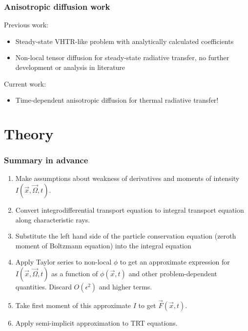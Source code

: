 \documentclass{beamer}
\begin{document}
\begin{frame}
  \frametitle{Anisotropic diffusion work}
  Previous work:
  \begin{itemize}
    \item Steady-state VHTR-like problem with analytically calculated
      coefficients \cite{Lar2009c}
    \item Non-local tensor diffusion \cite{Mor2007} for steady-state
      radiative transfer, no further development or
      analysis in literature
  \end{itemize}
  Current work:
  \begin{itemize}
    \item Time-dependent anisotropic diffusion for thermal radiative transfer!
  \end{itemize}
\end{frame}
\section{Theory}
\begin{frame}
  \frametitle{Summary in advance}
  \begin{enumerate}
    \item Make assumptions about weakness of derivatives and moments of
      intensity $I(\vec{x}, \vec{\Omega}, t)$.
    \item Convert integrodifferential transport equation to integral transport
      equation along characteristic rays.
    \item Substitute the left hand side of the particle conservation equation
      (zeroth moment of Boltzmann equation) into the integral equation
    \item Apply Taylor series to non-local $\phi$ to get an approximate
      expression for $I(\vec{x}, \vec{\Omega}, t)$ as a function of
      $\phi(\vec{x}, t)$ and other problem-dependent quantities.
      Discard $O(\epsilon^2)$ and higher terms.
    \item Take first moment of this approximate $I$ to get
      $\vec{F}(\vec{x}, t)$.
    \item Apply semi-implicit approximation to TRT equations.
  \end{enumerate}
\end{frame}
\end{document}
